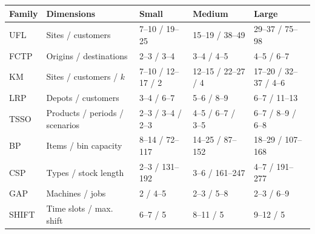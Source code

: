 \begin{tabular}{lllll}
\toprule
Family & Dimensions & Small & Medium & Large \\
\midrule
UFL & Sites / customers & 7--10 / 19--25 & 15--19 / 38--49 & 29--37 / 75--98 \\
FCTP & Origins / destinations & 2--3 / 3--4 & 3--4 / 4--5 & 4--5 / 6--7 \\
KM & Sites / customers / $k$ & 7--10 / 12--17 / 2 & 12--15 / 22--27 / 4 & 17--20 / 32--37 / 4--6 \\
LRP & Depots / customers & 3--4 / 6--7 & 5--6 / 8--9 & 6--7 / 11--13 \\
TSSO & Products / periods / scenarios & 2--3 / 3--4 / 2--3 & 4--5 / 6--7 / 3--5 & 6--7 / 8--9 / 6--8 \\
BP & Items / bin capacity & 8--14 / 72--117 & 14--25 / 87--152 & 18--29 / 107--168 \\
CSP & Types / stock length & 2--3 / 131--192 & 3--6 / 161--247 & 4--7 / 191--277 \\
GAP & Machines / jobs & 2 / 4--5 & 2--3 / 5--8 & 2--3 / 6--9 \\
SHIFT & Time slots / max. shift & 6--7 / 5 & 8--11 / 5 & 9--12 / 5 \\
\bottomrule
\end{tabular}
